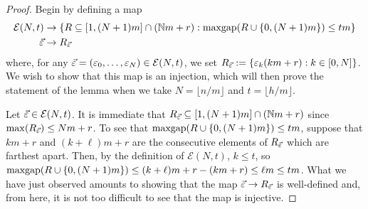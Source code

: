\begin{proof}
Begin by defining a map
\begin{align*}
\mathcal{E}(N,t)&\to\{R\subseteq[1,(N+1)m]\cap (\mathbb{N} m +r): \operatorname{maxgap}(R\cup\{0,(N+1)m\}) \le tm\} \\
\vec{\varepsilon} &\to R_{\vec{\varepsilon}}
\end{align*}
where, for any $\vec{\varepsilon} = (\varepsilon_0,\dots,\varepsilon_N) \in \mathcal{E}(N,t)$, we set $R_{\vec{\varepsilon}} := \{\varepsilon_k(km+r): k\in[0,N]\}$.
We wish to show that this map is an injection, which will then prove the statement of the lemma when we take $N = \lfloor n/m \rfloor$ and $t = \lfloor h/m \rfloor$.


Let $\vec{\varepsilon}\in \mathcal{E}(N,t)$.
It is immediate that $R_{\vec{\varepsilon}}\subseteq [1,(N+1)m]\cap (\mathbb{N} m + r)$ since $\max(R_{\vec{\varepsilon}}) \le Nm+r$.
To see that $\operatorname{maxgap}(R\cup\{0,(N+1)m\}) \le tm$, suppose that $km+r$ and $(k+\ell)m+r$ are the consecutive elements of $R_{\vec{\varepsilon}}$ which are farthest apart.
Then, by the definition of $\mathcal{E}(N,t)$, $k\le t$, so $\operatorname{maxgap}(R\cup \{0,(N+1)m\})\le (k+\ell)m+r - (km+r) \le \ell m \le tm$.
What we have just observed amounts to showing that the map $\vec{\varepsilon} \to R_{\vec{\varepsilon}}$ is well-defined and, from here, it is not too difficult to see that the map is injective.
%
%
%
%
\end{proof}


